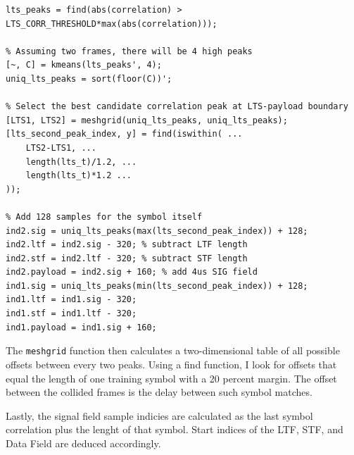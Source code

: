 \begin{lstlisting}[captionpos=b,caption={Collision Offset Detection using Meshgrid},label=lst:meshgrid]
% Find peaks above a parametrized threshold
lts_peaks = find(abs(correlation) > LTS_CORR_THRESHOLD*max(abs(correlation)));

% Assuming two frames, there will be 4 high peaks
[~, C] = kmeans(lts_peaks', 4);
uniq_lts_peaks = sort(floor(C))';

% Select the best candidate correlation peak at LTS-payload boundary
[LTS1, LTS2] = meshgrid(uniq_lts_peaks, uniq_lts_peaks);
[lts_second_peak_index, y] = find(iswithin( ...
    LTS2-LTS1, ...
    length(lts_t)/1.2, ...
    length(lts_t)*1.2 ...
));

% Add 128 samples for the symbol itself
ind2.sig = uniq_lts_peaks(max(lts_second_peak_index)) + 128;
ind2.ltf = ind2.sig - 320; % subtract LTF length
ind2.stf = ind2.ltf - 320; % subtract STF length
ind2.payload = ind2.sig + 160; % add 4us SIG field
ind1.sig = uniq_lts_peaks(min(lts_second_peak_index)) + 128;
ind1.ltf = ind1.sig - 320;
ind1.stf = ind1.ltf - 320;
ind1.payload = ind1.sig + 160;
\end{lstlisting}

The \texttt{meshgrid} function then calculates a two-dimensional table of all possible offsets between every two peaks. Using a find function, I look for offsets that equal the length of one training symbol with a 20 percent margin.  The offset between the collided frames is the delay between such symbol matches.

Lastly, the signal field sample indicies are calculated as the last symbol correlation plus the lenght of that symbol. Start indices of the \gls{LTF}, \gls{STF}, and Data Field are deduced accordingly.
